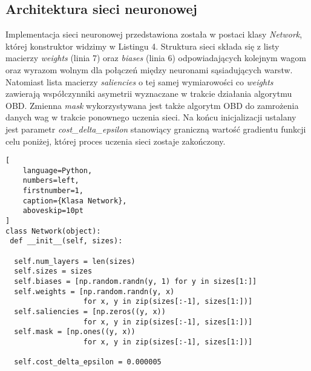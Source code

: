\subsection{Architektura sieci neuronowej}
Implementacja sieci neuronowej przedstawiona została w postaci klasy \emph{Network}, której konstruktor widzimy w Listingu 4. Struktura sieci składa się z listy macierzy \emph{weights} (linia 7) oraz \emph{biases} (linia 6) odpowiadających kolejnym wagom oraz wyrazom wolnym dla połączeń między neuronami sąsiadujących warstw. Natomiast lista macierzy \emph{saliencies} o tej samej wymiarowości co \emph{weights} zawierają współczynniki asymetrii wyznaczane w trakcie działania algorytmu OBD. Zmienna \emph{mask} wykorzystywana jest także algorytm OBD do zamrożenia danych wag w trakcie ponownego uczenia sieci. Na końcu inicjalizacji ustalany jest parametr \emph{cost{\_}delta{\_}epsilon} stanowiący graniczną wartość gradientu funkcji celu poniżej, której proces uczenia sieci zostaje zakończony.    
\begin{addmargin}[10mm]{0mm}
\begin{lstlisting}[
    language=Python,
    numbers=left,
    firstnumber=1,
    caption={Klasa Network},
    aboveskip=10pt
]
class Network(object):
 def __init__(self, sizes):
 
  self.num_layers = len(sizes)
  self.sizes = sizes
  self.biases = [np.random.randn(y, 1) for y in sizes[1:]]
  self.weights = [np.random.randn(y, x)
                  for x, y in zip(sizes[:-1], sizes[1:])]
  self.saliencies = [np.zeros((y, x))
                  for x, y in zip(sizes[:-1], sizes[1:])]
  self.mask = [np.ones((y, x))
                  for x, y in zip(sizes[:-1], sizes[1:])]

  self.cost_delta_epsilon = 0.000005
\end{lstlisting}
\end{addmargin}
